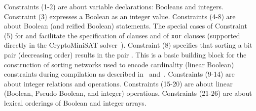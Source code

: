 \documentclass[runningheads,a4paper]{llncs}
\begin{document}
Constraints (1-2) are about variable declarations: Booleans and
integers. Constraint (3) expresses a Boolean as an integer value.
Constraints (4-8) are about Boolean (and reified Boolean)
statements. The special cases of Constraint (5) for
 and
 facilitate the
specification of clauses and of \texttt{xor} clauses (supported
directly in the CryptoMiniSAT solver~\cite{Crypto}).
Constraint (8) specifies that sorting a bit pair 
(decreasing order) results in the pair . This is a
basic building block for the construction of sorting networks
\cite{Batcher68} used to encode cardinality (linear Boolean)
constraints during compilation as described in~\cite{AsinNOR11}
and~\cite{DBLP:conf/lpar/CodishZ10}.
Constraints (9-14) are about integer relations and operations.
Constraints (15-20) are about linear (Boolean, Pseudo Boolean, and
integer) operations.
Constraints (21-26) are about lexical orderings of Boolean and integer
arrays.  
\end{document}
